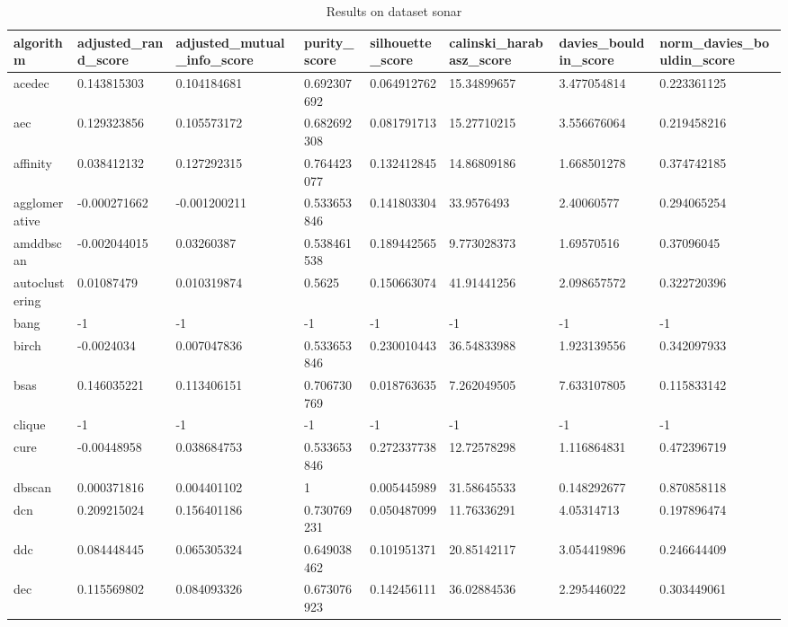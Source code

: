 \begin{table}[H]
\centering
\caption{Results on dataset sonar}
\label{tab:params:sonar}
\begin{tabular}{|l|l|l|l|l|l|l|l|}
\hline
algorithm & adjusted\_rand\_score & adjusted\_mutual\_info\_score & purity\_score & silhouette\_score & calinski\_harabasz\_score & davies\_bouldin\_score & norm\_davies\_bouldin\_score \\
\hline
acedec & 0.143815303 & 0.104184681 & 0.692307692 & 0.064912762 & 15.34899657 & 3.477054814 & 0.223361125 \\
\hline
aec & 0.129323856 & 0.105573172 & 0.682692308 & 0.081791713 & 15.27710215 & 3.556676064 & 0.219458216 \\
\hline
affinity & 0.038412132 & 0.127292315 & 0.764423077 & 0.132412845 & 14.86809186 & 1.668501278 & 0.374742185 \\
\hline
agglomerative & -0.000271662 & -0.001200211 & 0.533653846 & 0.141803304 & 33.9576493 & 2.40060577 & 0.294065254 \\
\hline
amddbscan & -0.002044015 & 0.03260387 & 0.538461538 & 0.189442565 & 9.773028373 & 1.69570516 & 0.37096045 \\
\hline
autoclustering & 0.01087479 & 0.010319874 & 0.5625 & 0.150663074 & 41.91441256 & 2.098657572 & 0.322720396 \\
\hline
bang & -1 & -1 & -1 & -1 & -1 & -1 & -1 \\
\hline
birch & -0.0024034 & 0.007047836 & 0.533653846 & 0.230010443 & 36.54833988 & 1.923139556 & 0.342097933 \\
\hline
bsas & 0.146035221 & 0.113406151 & 0.706730769 & 0.018763635 & 7.262049505 & 7.633107805 & 0.115833142 \\
\hline
clique & -1 & -1 & -1 & -1 & -1 & -1 & -1 \\
\hline
cure & -0.00448958 & 0.038684753 & 0.533653846 & 0.272337738 & 12.72578298 & 1.116864831 & 0.472396719 \\
\hline
dbscan & 0.000371816 & 0.004401102 & 1 & 0.005445989 & 31.58645533 & 0.148292677 & 0.870858118 \\
\hline
dcn & 0.209215024 & 0.156401186 & 0.730769231 & 0.050487099 & 11.76336291 & 4.05314713 & 0.197896474 \\
\hline
ddc & 0.084448445 & 0.065305324 & 0.649038462 & 0.101951371 & 20.85142117 & 3.054419896 & 0.246644409 \\
\hline
dec & 0.115569802 & 0.084093326 & 0.673076923 & 0.142456111 & 36.02884536 & 2.295446022 & 0.303449061 \\

\end{tabular}
\end{table}
